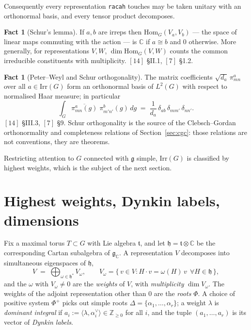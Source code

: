 \documentclass[11pt,a4paper]{article}
\theoremstyle{plain}
\theoremstyle{definition}
\newtheorem{fact}[theorem]{Fact}
\newcommand{\g}{\mathfrak{g}}
\newcommand{\Irr}{\mathrm{Irr}}
\newcommand{\Hom}{\mathrm{Hom}}
\newcommand{\ZZ}{\mathbb{Z}}
\newcommand{\CC}{\mathbb{C}}
\newcommand{\code}[1]{\texttt{#1}}
\begin{document}
Consequently every representation \code{racah} touches may be taken unitary
with an orthonormal basis, and every tensor product decomposes.

\begin{fact}[Schur's lemma]\label{fact:schur}
If $a,b$ are irreps then $\Hom_G(V_a,V_b)$ --- the space of linear maps
commuting with the action --- is $\CC$ if $a\cong b$ and $0$ otherwise. More
generally, for representations $V,W$, $\dim\Hom_G(V,W)$ counts the common
irreducible constituents with multiplicity. $[14]$ \S II.1, $[7]$ \S1.2.
\end{fact}

\begin{fact}[Peter--Weyl and Schur orthogonality]\label{fact:pw}
The matrix coefficients $\sqrt{d_a}\,\pi^a_{mn}$ over all $a\in\Irr(G)$ form an
orthonormal basis of $L^2(G)$ with respect to normalised Haar measure; in
particular
\[
  \int_G \overline{\pi^a_{m n}(g)}\;\pi^b_{m' n'}(g)\,dg
   \;=\; \frac{1}{d_a}\,\delta_{ab}\,\delta_{m m'}\,\delta_{n n'}.
\]
$[14]$ \S III.3, $[7]$ \S9. Schur orthogonality is the source of the
Clebsch--Gordan orthonormality and completeness relations of
Section~\ref{sec:cgc}: those relations are not conventions, they are theorems.
\end{fact}

Restricting attention to $G$ connected with $\g$ simple, $\Irr(G)$ is
classified by highest weights, which is the subject of the next section.

\section{Highest weights, Dynkin labels, dimensions}
\label{sec:hw}

Fix a maximal torus $T\subset G$ with Lie algebra $\mathfrak{t}$, and let
$\mathfrak{h} = \mathfrak{t}\otimes\CC$ be the corresponding Cartan subalgebra
of $\g_\CC$. A representation $V$ decomposes into simultaneous eigenspaces of
$\mathfrak{h}$,
\[
  V \;=\; \bigoplus_{\omega\in\mathfrak{h}^*} V_\omega,
  \qquad
  V_\omega = \{\, v\in V : H\cdot v = \omega(H)\,v \ \ \forall H\in\mathfrak{h}\,\},
\]
and the $\omega$ with $V_\omega\neq 0$ are the \emph{weights} of $V$, with
\emph{multiplicity} $\dim V_\omega$. The weights of the adjoint representation
other than $0$ are the \emph{roots} $\Phi$. A choice of positive system
$\Phi^+$ picks out simple roots $\Delta=\{\alpha_1,\dots,\alpha_r\}$; a weight
$\lambda$ is \emph{dominant integral} if
$a_i := \langle\lambda,\alpha_i^\vee\rangle \in \ZZ_{\ge 0}$ for all $i$, and
the tuple $(a_1,\dots,a_r)$ is its vector of \emph{Dynkin labels}.
\end{document}
